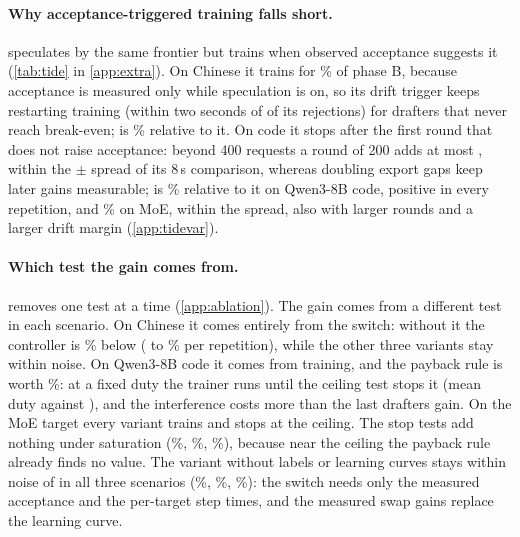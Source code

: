 \paragraph{Why acceptance-triggered training falls short.}  speculates by the same frontier but trains when observed acceptance suggests it (\cref{tab:tide} in \cref{app:extra}). On Chinese it trains for \% of phase B, because acceptance is measured only while speculation is on, so its drift trigger keeps restarting training (within two seconds of  of its  rejections) for drafters that never reach break-even;  is \% relative to it. On code it stops after the first round that does not raise acceptance: beyond 400 requests a round of 200 adds at most , within the $\pm$ spread of its 8\,s comparison, whereas doubling export gaps keep later gains measurable;  is \% relative to it on Qwen3-8B code, positive in every repetition, and \% on MoE, within the spread, also with larger rounds and a larger drift margin (\cref{app:tidevar}).

\paragraph{Which test the gain comes from.}  removes one test at a time (\cref{app:ablation}). The gain comes from a different test in each scenario. On Chinese it comes entirely from the switch: without it the controller is \% below  ( to \% per repetition), while the other three variants stay within noise. On Qwen3-8B code it comes from training, and the payback rule is worth \%: at a fixed duty the trainer runs until the ceiling test stops it (mean duty  against ), and the interference costs more than the last drafters gain. On the MoE target every variant trains and stops at the ceiling. The stop tests add nothing under saturation (\%, \%, \%), because near the ceiling the payback rule already finds no value. The variant without labels or learning curves stays within noise of  in all three scenarios (\%, \%, \%): the switch needs only the measured acceptance and the per-target step times, and the measured swap gains replace the learning curve.

